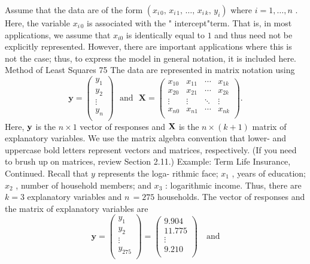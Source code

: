 \documentclass[11pt]{article}
\begin{document}
 Assume that the data are of the form \(\left( x_{i \, 0} , \, x_{i \, 1} , \, \ldots, \, x_{i \, k} , \, y_{i} \right)\) where \(i=1 , \dots, n\) .
Here, the variable \(x_{i \, 0}\) is associated with the " intercept"term. That is, in most
applications, we assume that \(x_{i 0}\) is identically equal to \(1\) and thus need not be
explicitly represented. However, there are important applications where this is
not the case; thus, to express the model in general notation, it is included here.
 Method of Least Squares 75
 The data are represented in matrix notation using
\[
\mathbf{y}=\left( \begin{matrix} {y_{1}} \\ {y_{2}} \\ {\vdots} \\ {y_{n}} \\ \end{matrix} \right) \ \ \ \mathrm{a n d} \ \ \ \mathbf{X}=\left( \begin{matrix} {x_{1 0}} & {x_{1 1}} & {\cdots} & {x_{1 k}} \\ {x_{2 0}} & {x_{2 1}} & {\cdots} & {x_{2 k}} \\ {\vdots} & {\vdots} & {\ddots} & {\vdots} \\ {x_{n 0}} & {x_{n 1}} & {\cdots} & {x_{n k}} \\ \end{matrix} \right) .
\]
Here, \({\bf y}\) is the \(n \times1\) vector of responses and \({\bf X}\) is the \(n \times( k+1 )\) matrix of
explanatory variables. We use the matrix algebra convention that lower- and
uppercase bold letters represent vectors and matrices, respectively. (If you need
 to brush up on matrices, review Section 2.11.)
 Example: Term Life Insurance, Continued. Recall that \(y\) represents the loga-
rithmic face; \(x_{1}\) , years of education; \(x_{2}\) , number of household members; and \(x_{3}\) :
logarithmic income. Thus, there are \(k=3\) explanatory variables and \(n \,=2 7 5\)
 households. The vector of responses and the matrix of explanatory variables are
\[
\mathbf{y}=\left( \begin{matrix} {y_{1}} \\ {y_{2}} \\ {\vdots} \\ {y_{2 7 5}} \\ \end{matrix} \right)=\left( \begin{matrix} {9 . 9 0 4} \\ {1 1 . 7 7 5} \\ {\vdots} \\ {9 . 2 1 0} \\ \end{matrix} \right) \quad\mathrm{a n d}
\]
\end{document}
